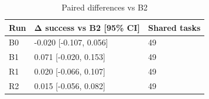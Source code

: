 \begin{table}[t]
\centering
\caption{Paired differences vs B2}
\begin{tabular}{lll}
\hline
Run & Δ success vs B2 [95\% CI] & Shared tasks \\
\hline
B0 & -0.020 [-0.107, 0.056] & 49 \\
B1 & 0.071 [-0.020, 0.153] & 49 \\
R1 & 0.020 [-0.066, 0.107] & 49 \\
R2 & 0.015 [-0.056, 0.082] & 49 \\
\hline
\end{tabular}
\end{table}
